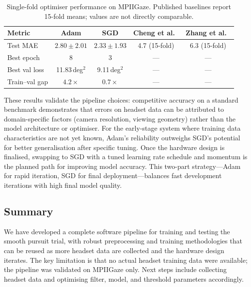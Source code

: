\begin{table}[htbp]
    \centering
    \caption{Single-fold optimiser performance on MPIIGaze. Published baselines report 15-fold means; values are not directly comparable.}
    \label{tab:optimiser-comparison}
    \begin{tabular}{lcccc}
        \toprule
        \textbf{Metric} & \textbf{Adam} & \textbf{SGD} & \textbf{Cheng et al.~\cite{cheng2018appearance}} & \textbf{Zhang et al.~\cite{zhang2015appearance}} \\
        \midrule
        Test MAE            & $2.80 \pm 2.01$\textdegree{} & $2.33 \pm 1.93$\textdegree{} & 4.7\textdegree{} (15-fold) & 6.3\textdegree{} (15-fold) \\
        Best epoch          & 8                             & 3                             & ---                        & ---                        \\
        Best val loss       & 11.83\,deg$^2$                & 9.11\,deg$^2$                 & ---                        & ---                        \\
        Train--val gap      & $4.2\times$                   & $0.7\times$                   & ---                        & ---                        \\
        \bottomrule
    \end{tabular}
\end{table}

These results validate the pipeline choices: competitive accuracy on a standard benchmark demonstrates that errors on headset data can be attributed to domain-specific factors (camera resolution, viewing geometry) rather than the model architecture or optimiser. For the early-stage system where training data characteristics are not yet known, Adam's reliability outweighs SGD's potential for better generalisation after specific tuning. Once the hardware design is finalised, swapping to SGD with a tuned learning rate schedule and momentum is the planned path for improving model accuracy. This two-part strategy---Adam for rapid iteration, SGD for final deployment---balances fast development iterations with high final model quality.

\subsection{Summary}

We have developed a complete software pipeline for training and testing the smooth pursuit trial, with robust preprocessing and training methodologies that can be reused as more headset data are collected and the hardware design iterates. The key limitation is that no actual headset training data were available; the pipeline was validated on MPIIGaze only. Next steps include collecting headset data and optimising filter, model, and threshold parameters accordingly.


